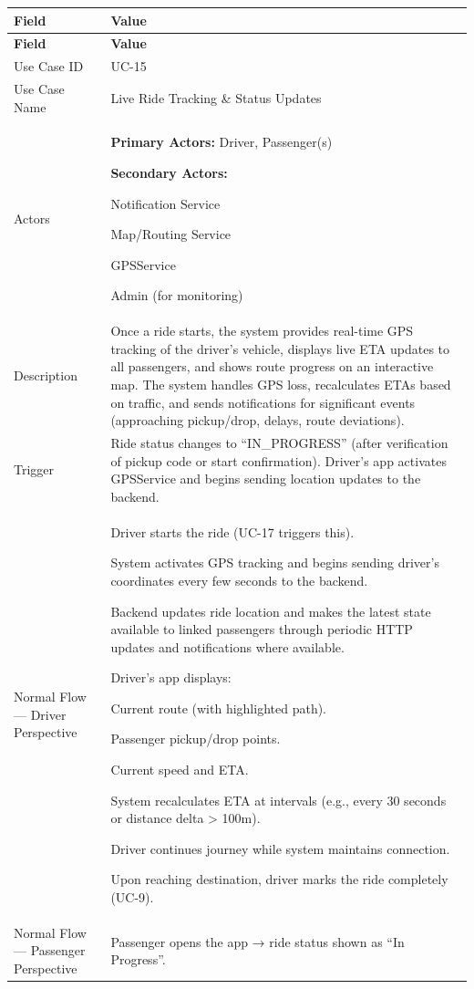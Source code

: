 \begin{longtable}{|p{3.5cm}|p{12cm}|}
\hline
\rowcolor{lightgray!30}
\textbf{Field} & \textbf{Value} \\
\hline
\endfirsthead
\hline
\rowcolor{lightgray!30}
\textbf{Field} & \textbf{Value} \\
\hline
\endhead
\hline
\endfoot
Use Case ID & UC-15 \\
\hline
Use Case Name & Live Ride Tracking \& Status Updates \\
\hline
Actors &
\textbf{Primary Actors:} Driver, Passenger(s)

\textbf{Secondary Actors:}

Notification Service

Map/Routing Service

GPSService

Admin (for monitoring) \\
\hline
Description &
Once a ride starts, the system provides real-time GPS tracking of the driver’s vehicle, displays live ETA updates to all passengers, and shows route progress on an interactive map. The system handles GPS loss, recalculates ETAs based on traffic, and sends notifications for significant events (approaching pickup/drop, delays, route deviations). \\
\hline
Trigger &
Ride status changes to “IN\_PROGRESS” (after verification of pickup code or start confirmation). Driver’s app activates GPSService and begins sending location updates to the backend. \\
\hline
Normal Flow — Driver Perspective &
Driver starts the ride (UC-17 triggers this).

System activates GPS tracking and begins sending driver’s coordinates every few seconds to the backend.

Backend updates ride location and makes the latest state available to linked passengers through periodic HTTP updates and notifications where available.

Driver’s app displays:

Current route (with highlighted path).

Passenger pickup/drop points.

Current speed and ETA.

System recalculates ETA at intervals (e.g., every 30 seconds or distance delta > 100m).

Driver continues journey while system maintains connection.

Upon reaching destination, driver marks the ride completely (UC-9). \\
\hline
Normal Flow — Passenger Perspective &
Passenger opens the app → ride status shown as “In Progress”.


\end{longtable}
